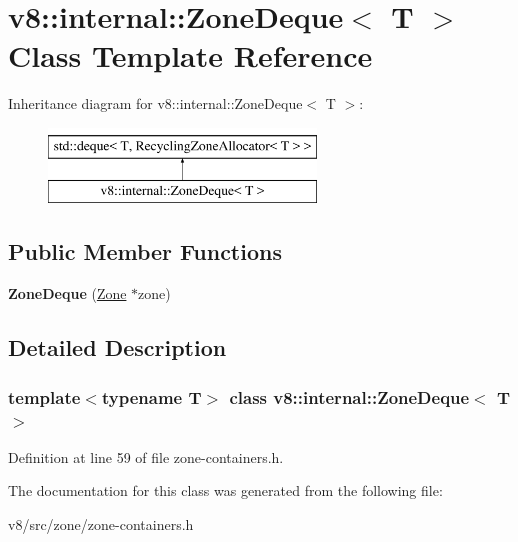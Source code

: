 \hypertarget{classv8_1_1internal_1_1ZoneDeque}{}\section{v8\+:\+:internal\+:\+:Zone\+Deque$<$ T $>$ Class Template Reference}
\label{classv8_1_1internal_1_1ZoneDeque}
Inheritance diagram for v8\+:\+:internal\+:\+:Zone\+Deque$<$ T $>$\+:\begin{figure}[H]
\begin{center}
\leavevmode
\includegraphics[height=2.000000cm]{classv8_1_1internal_1_1ZoneDeque}
\end{center}
\end{figure}
\subsection*{Public Member Functions}
\begin{DoxyCompactItemize}
\item 
\mbox{\label{classv8_1_1internal_1_1ZoneDeque_a8780f07350de9636469cebaafd6e93bf}} 
{\bfseries Zone\+Deque} (\mbox{\hyperlink{classv8_1_1internal_1_1Zone}{Zone}} $\ast$zone)
\end{DoxyCompactItemize}


\subsection{Detailed Description}
\subsubsection*{template$<$typename T$>$\newline
class v8\+::internal\+::\+Zone\+Deque$<$ T $>$}



Definition at line 59 of file zone-\/containers.\+h.



The documentation for this class was generated from the following file\+:\begin{DoxyCompactItemize}
\item 
v8/src/zone/zone-\/containers.\+h\end{DoxyCompactItemize}
